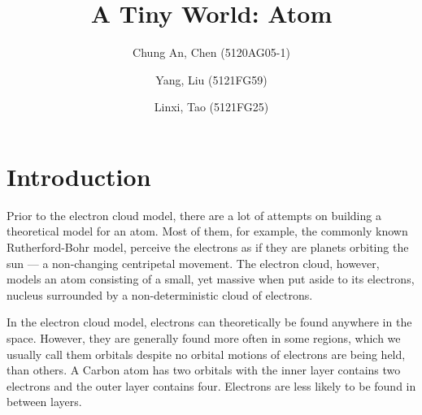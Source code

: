 \documentclass[acmtog]{acmart}
\begin{document}
\title{A Tiny World: Atom}

\author{Chung An, Chen (5120AG05-1)}
\author{Yang, Liu (5121FG59)}
\author{Linxi, Tao (5121FG25)}





\maketitle

\section{Introduction}
Prior to the electron cloud model, there are a lot of attempts on building a theoretical model for an atom. Most of them, for example, the commonly known Rutherford-Bohr model, perceive the electrons as if they are planets orbiting the sun --- a non-changing centripetal movement. The electron cloud, however, models an atom consisting of a small, yet massive when put aside to its electrons, nucleus surrounded by a non-deterministic cloud of electrons.

In the electron cloud model, electrons can theoretically be found anywhere in the space. However, they are generally found more often in some regions, which we usually call them orbitals despite no orbital motions of electrons are being held, than others. A Carbon atom has two orbitals with the inner layer contains two electrons and the outer layer contains four. Electrons are less likely to be found in between layers.
\end{document}
